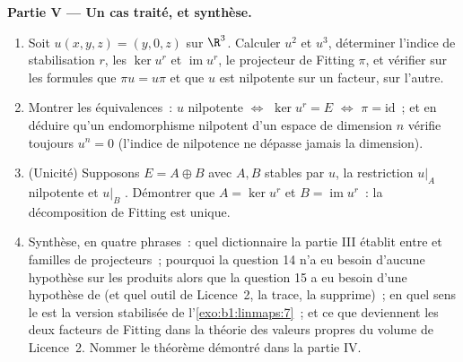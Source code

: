 \begin{problem}
\medskip
\noindent\textbf{Partie V --- Un cas traité, et synthèse.}
\begin{enumerate}[resume]
  \item Soit $u(x, y, z) = (y, 0, z)$ sur $\R^3$. Calculer $u^2$ et
        $u^3$, déterminer l'indice de stabilisation $r$, les
         $\ker u^{r}$ et $\operatorname{im} u^{r}$, le
        projecteur de Fitting $\pi$, et vérifier sur les formules que
        $\pi u = u\pi$ et que $u$ est nilpotente sur un facteur,
         sur l'autre.
  \item Montrer les équivalences~: $u$ nilpotente $\iff$ $\ker u^{r} =
        E$ $\iff$ $\pi = \mathrm{id}$~; et en déduire qu'un
        endomorphisme nilpotent d'un espace de dimension $n$
        vérifie toujours $u^{n} = 0$ (l'indice de nilpotence ne
        dépasse jamais la dimension).
  \item (Unicité) Supposons $E = A \oplus B$ avec $A, B$ stables
        par $u$, la restriction $u|_A$ nilpotente et $u|_B$
        . Démontrer que $A = \ker u^{r}$ et $B =
        \operatorname{im} u^{r}$~: la décomposition de Fitting est
        unique.
  \item Synthèse, en quatre phrases~: quel dictionnaire la partie III
        établit entre  et familles de
        projecteurs~; pourquoi la question 14 n'a eu besoin d'aucune
        hypothèse sur les produits alors que la question 15 a eu besoin d'une hypothèse de 
        (et quel outil de Licence~2, la trace, la supprime)~; en quel
        sens le  est la version stabilisée de
        l'\cref{exo:b1:linmaps:7}~; et ce que deviennent les deux facteurs de
        Fitting dans la théorie des valeurs propres du volume de
        Licence~2. Nommer le théorème démontré dans la partie IV.
\end{enumerate}
\end{problem}
